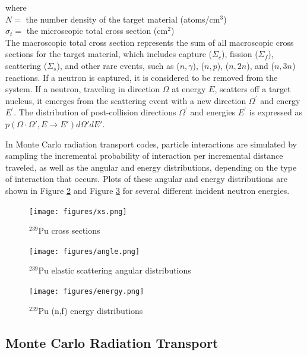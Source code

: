 \noindent where \\
\indent $N = $ the number density of the target material (atoms/cm$^{3}$) \\
\indent $\sigma_{t} = $ the microscopic total cross section (cm$^{2}$) \\

The macroscopic total cross section represents the sum of all macroscopic cross sections for the target material, which includes capture ($\Sigma_{c}$), fission ($\Sigma_{f}$), scattering ($\Sigma_{s}$), and other rare events, such as ($n, \gamma$), ($n, p$), ($n, 2n$), and ($n, 3n$) reactions.
If a neutron is captured, it is considered to be removed from the system.
If a neutron, traveling in direction $\Omega$ at energy $E$, scatters off a target nucleus, it emerges from the scattering event with a new direction $\Omega^{\prime}$ and energy $E^{\prime}$.
The distribution of post-collision directions $\Omega^{\prime}$ and energies $E^{\prime}$ is expressed as $p(\Omega \cdot \Omega', E \rightarrow E')d\Omega'dE'$.

In Monte Carlo radiation transport codes, particle interactions are simulated by sampling the incremental probability of interaction per incremental distance traveled, as well as the angular and energy distributions, depending on the type of interaction that occurs.
Plots of these angular and energy distributions are shown in Figure \ref{fig:angle} and Figure \ref{fig:energy} for several different incident neutron energies.

\begin{figure}
  \centering
  \texttt{[image: figures/xs.png]}
  \caption{$^{239}$Pu cross sections}
  \label{fig:xs}
\end{figure}

\begin{figure}
  \centering
  \texttt{[image: figures/angle.png]}
  \caption{$^{239}$Pu elastic scattering angular distributions}
  \label{fig:angle}
\end{figure}

\begin{figure}
  \centering
  \texttt{[image: figures/energy.png]}
  \caption{$^{239}$Pu (n,f) energy distributions}
  \label{fig:energy}
\end{figure}


\subsection{Monte Carlo Radiation Transport}

